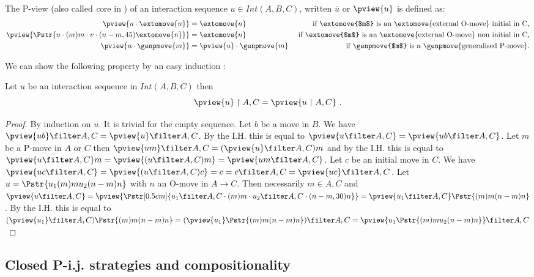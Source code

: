 The P-view (also called {\emph core} in \cite{McCusker-GamesandFullAbstrac}) of an interaction sequence $u \in Int(A,B,C)$, written $\overline{u}$ or $\pview{u}$ is defined as:
\begin{align*}
\pview{u\cdot \extomove{n}} &= \extomove{n} &
\mbox{ if \extomove{$m$} is an \extomove{external O-move} initial in C,}\\
\pview{\Pstr{u\cdot (m)m\cdot v \cdot (n-m,45){\extomove{n}} }} &= \extomove{n} &\mbox{ if \extomove{$m$} is an \extomove{external O-move} non initial in C,}\\
\pview{u \cdot \genpmove{m}} &= \pview{u}\cdot \genpmove{m}  & \mbox{ if \genpmove{$m$} is a \genpmove{generalised P-move}.}\\
\end{align*}

We can show the following property by an easy induction :
\begin{lemma}
\label{lem:pviewAC_eq_ACpview}
 Let $u$ be an interaction sequence in $Int(A,B,C)$ then
$$\pview{u} \upharpoonright A,C = \pview{u \upharpoonright A,C} \ .$$
\end{lemma}
\begin{proof}
  By induction on $u$. It is trivial for the empty sequence.
Let $b$ be a move in $B$. We have $\pview{u b} \filter A,C = \pview{u} \filter A,C$. By the I.H. this is equal to $\pview{u \filter A,C} = \pview{u b\filter A,C}$.
Let $m$ be a P-move in $A$ or $C$ then $\pview{u m} \filter A,C = (\pview{u} \filter A,C) m$ and by the I.H. this is
equal to $\pview{u \filter A,C} m = \pview{(u \filter A,C) m} = \pview{u m \filter A,C}$.
Let $c$ be an initial move in $C$. We have 
$\pview{u c \filter A,C}  = \pview{(u \filter A,C) c} = c =  c \filter A,C = \pview{u c} \filter A,C$.
Let $u = \Pstr{u_1 (m){m} u_2 (n-m){n}}$ with $n$ an O-move in $A\rightarrow C$. Then necessarily $m\in A,C$ and 
$ \pview{u\filter A,C} = \pview{\Pstr[0.5cm]{u_1\filter A,C \cdot (m){m} \cdot u_2\filter A,C \cdot (n-m,30){n}}} =
 \pview{u_1 \filter A,C} \Pstr{(m){m} (n-m){n}}$. By the I.H. this is equal to 
$(\pview{u_1}\filter A,C) \Pstr{(m){m} (n-m){n}} =
(\pview{u_1} \Pstr{(m){m} (n-m){n}} ) \filter A,C  =
\pview{u_1 \Pstr{(m){m} u_2 (n-m){n}}} \filter A,C$
\end{proof}

\subsection{Closed P-i.j. strategies and compositionality}

